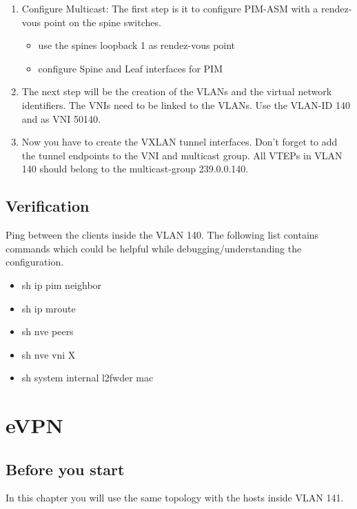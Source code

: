 \documentclass[11pt,titlepage]{article}
\newenvironment{shadedquotation}
 {\begin{shaded*}
  \quoting[leftmargin=0pt, vskip=0pt]
 }
 {\endquoting
 \end{shaded*}
}
\begin{document}
\begin{shadedquotation}
	\begin{enumerate}
		\item Configure Multicast: The first step is it to configure PIM-ASM with a rendez-vous point on the spine switches.
		\begin{itemize}
			\item use the spines loopback 1 as rendez-vous point
			\item configure Spine and Leaf interfaces for PIM
	\end{itemize}
		\item The next step will be the creation of the VLANs and the virtual network identifiers. The VNIs need to be linked to the VLANs. Use the VLAN-ID 140 and as VNI 50140.
		\item Now you have to create the VXLAN tunnel interfaces. Don’t forget to add the tunnel endpoints to the VNI and multicast group. All VTEPs in VLAN 140 should belong to the multicast-group 239.0.0.140.
  \end{enumerate}
\end{shadedquotation}

\subsection{Verification}
\label{subsec:Verification}
\begin{shadedquotation}
  Ping between the clients inside the VLAN 140.
  The following list contains commands which could be helpful while debugging/understanding   the configuration.
  \begin{itemize}
  	\item sh ip pim neighbor
  	\item sh ip mroute
  	\item sh nve peers
  	\item sh nve vni X
  	\item sh system internal l2fwder mac
  \end{itemize}
\end{shadedquotation}
\section{eVPN}
\subsection{Before you start}
In this chapter you will use the same topology with the hosts inside VLAN 141.
\end{document}

